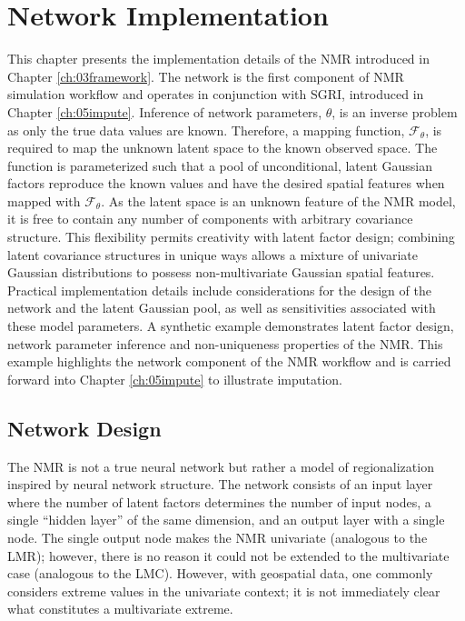 
\chapter{Network Implementation}
\label{ch:04implement}

This chapter presents the implementation details of the \gls{NMR} introduced in Chapter \ref{ch:03framework}. The network is the first component of \gls{NMR} simulation workflow and operates in conjunction with \gls{SGRI}, introduced in Chapter \ref{ch:05impute}. Inference of network parameters, $\theta$, is an inverse problem as only the true data values are known. Therefore, a mapping function, $\mathcal{F}_{\theta}$, is required to map the unknown latent space to the known observed space. The function is parameterized such that a pool of unconditional, latent Gaussian factors reproduce the known values and have the desired spatial features when mapped with $\mathcal{F}_{\theta}$. As the latent space is an unknown feature of the \gls{NMR} model, it is free to contain any number of components with arbitrary covariance structure. This flexibility permits creativity with latent factor design; combining latent covariance structures in unique ways allows a mixture of univariate Gaussian distributions to possess non-multivariate Gaussian spatial features. Practical implementation details include considerations for the design of the network and the latent Gaussian pool, as well as sensitivities associated with these model parameters. A synthetic example demonstrates latent factor design, network parameter inference and non-uniqueness properties of the \gls{NMR}. This example highlights the network component of the \gls{NMR} workflow and is carried forward into Chapter \ref{ch:05impute} to illustrate imputation.

\FloatBarrier
\section{Network Design}
\label{sec:04networkd}

The \gls{NMR} is not a true neural network but rather a model of regionalization inspired by neural network structure. The network consists of an input layer where the number of latent factors determines the number of input nodes, a single ``hidden layer'' of the same dimension, and an output layer with a single node. The single output node makes the \gls{NMR} univariate (analogous to the \gls{LMR}); however, there is no reason it could not be extended to the multivariate case (analogous to the \gls{LMC}). However, with geospatial data, one commonly considers extreme values in the univariate context; it is not immediately clear what constitutes a multivariate extreme.

